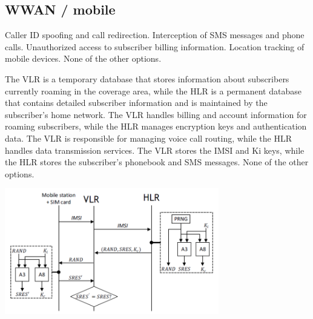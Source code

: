 \begin{questions}
    \section{WWAN / mobile}



    \begin{checkboxes}
        \CorrectChoice Caller ID spoofing and call redirection.
        \CorrectChoice Interception of SMS messages and phone calls.
        \choice Unauthorized access to subscriber billing information.
        \choice Location tracking of mobile devices.
        \choice None of the other options.
    \end{checkboxes}


    \begin{checkboxes}
        \CorrectChoice The VLR is a temporary database that stores information about subscribers currently roaming in the coverage area, while the HLR is a permanent database that contains detailed subscriber information and is maintained by the subscriber's home network.
        \choice The VLR handles billing and account information for roaming subscribers, while the HLR manages encryption keys and authentication data.
        \choice The VLR is responsible for managing voice call routing, while the HLR handles data transmission services.
        \choice The VLR stores the IMSI and Ki keys, while the HLR stores the subscriber's phonebook and SMS messages.
        \choice None of the other options.
    \end{checkboxes}


    \begin{solution}
        \center
        \includegraphics[width=0.7\textwidth]{images/GSM_auth.png}
    \end{solution}



\end{questions}
